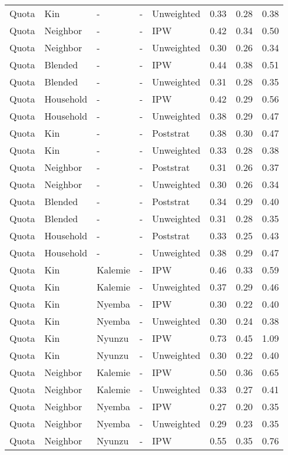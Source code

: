 \begin{longtable}[t]{lllllrrr}
Quota & Kin & - & - & Unweighted & 0.33 & 0.28 & 0.38\\
Quota & Neighbor & - & - & IPW & 0.42 & 0.34 & 0.50\\
Quota & Neighbor & - & - & Unweighted & 0.30 & 0.26 & 0.34\\
\addlinespace
Quota & Blended & - & - & IPW & 0.44 & 0.38 & 0.51\\
Quota & Blended & - & - & Unweighted & 0.31 & 0.28 & 0.35\\
Quota & Household & - & - & IPW & 0.42 & 0.29 & 0.56\\
Quota & Household & - & - & Unweighted & 0.38 & 0.29 & 0.47\\
Quota & Kin & - & - & Poststrat & 0.38 & 0.30 & 0.47\\
\addlinespace
Quota & Kin & - & - & Unweighted & 0.33 & 0.28 & 0.38\\
Quota & Neighbor & - & - & Poststrat & 0.31 & 0.26 & 0.37\\
Quota & Neighbor & - & - & Unweighted & 0.30 & 0.26 & 0.34\\
Quota & Blended & - & - & Poststrat & 0.34 & 0.29 & 0.40\\
Quota & Blended & - & - & Unweighted & 0.31 & 0.28 & 0.35\\
\addlinespace
Quota & Household & - & - & Poststrat & 0.33 & 0.25 & 0.43\\
Quota & Household & - & - & Unweighted & 0.38 & 0.29 & 0.47\\
Quota & Kin & Kalemie & - & IPW & 0.46 & 0.33 & 0.59\\
Quota & Kin & Kalemie & - & Unweighted & 0.37 & 0.29 & 0.46\\
Quota & Kin & Nyemba & - & IPW & 0.30 & 0.22 & 0.40\\
\addlinespace
Quota & Kin & Nyemba & - & Unweighted & 0.30 & 0.24 & 0.38\\
Quota & Kin & Nyunzu & - & IPW & 0.73 & 0.45 & 1.09\\
Quota & Kin & Nyunzu & - & Unweighted & 0.30 & 0.22 & 0.40\\
Quota & Neighbor & Kalemie & - & IPW & 0.50 & 0.36 & 0.65\\
Quota & Neighbor & Kalemie & - & Unweighted & 0.33 & 0.27 & 0.41\\
\addlinespace
Quota & Neighbor & Nyemba & - & IPW & 0.27 & 0.20 & 0.35\\
Quota & Neighbor & Nyemba & - & Unweighted & 0.29 & 0.23 & 0.35\\
Quota & Neighbor & Nyunzu & - & IPW & 0.55 & 0.35 & 0.76\\

\end{longtable}
